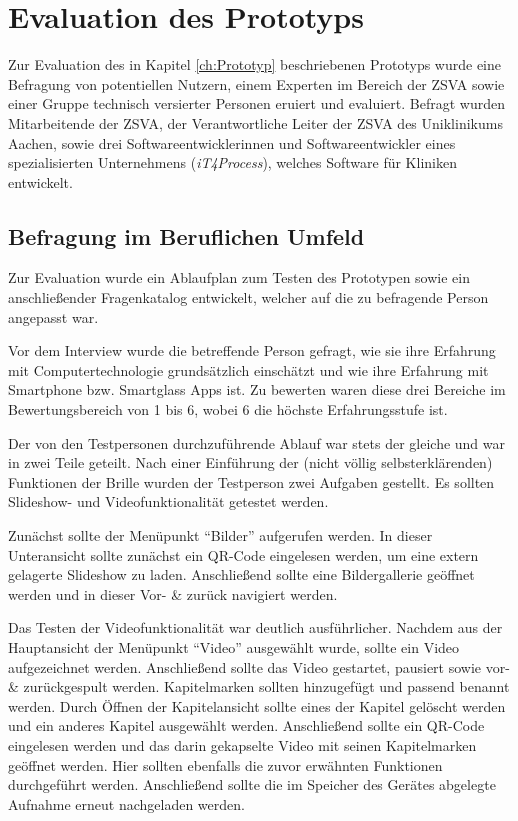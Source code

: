 %
%
%
%
%
%
\chapter{Evaluation des Prototyps}
\label{ch:Evaluation_des_Prototyps}
Zur Evaluation des in Kapitel \ref{ch:Prototyp} beschriebenen Prototyps wurde eine Befragung von potentiellen Nutzern, einem Experten im Bereich der ZSVA sowie einer Gruppe technisch versierter Personen eruiert und evaluiert. Befragt wurden
Mitarbeitende der ZSVA, 
der Verantwortliche Leiter der ZSVA des Uniklinikums Aachen, 
sowie drei Softwareentwicklerinnen und Softwareentwickler eines spezialisierten Unternehmens (\emph{iT4Process}), welches Software für Kliniken entwickelt.
%
%
%
%
%
%
%
%
\section{Befragung im Beruflichen Umfeld}
\label{sec:Befragung_im_Beruflichen_Umfeld}
Zur Evaluation wurde ein Ablaufplan zum Testen des Prototypen sowie ein anschließender Fragenkatalog entwickelt, welcher auf die zu befragende Person angepasst war. 

Vor dem Interview wurde die betreffende Person gefragt, wie sie ihre Erfahrung mit Computertechnologie grundsätzlich einschätzt und wie ihre Erfahrung mit Smartphone bzw. Smartglass Apps ist. Zu bewerten waren diese drei Bereiche im Bewertungsbereich von 1 bis 6, wobei 6 die höchste Erfahrungsstufe ist.

Der von den Testpersonen durchzuführende Ablauf war stets der gleiche und war in zwei Teile geteilt. Nach einer Einführung der (nicht völlig selbsterklärenden) Funktionen der Brille wurden der Testperson zwei Aufgaben gestellt. Es sollten Slideshow- und Videofunktionalität getestet werden. 

Zunächst sollte der Menüpunkt \enquote{Bilder} aufgerufen werden. In dieser Unteransicht sollte zunächst ein QR-Code eingelesen werden, um eine extern gelagerte Slideshow zu laden. Anschließend sollte eine Bildergallerie geöffnet werden und in dieser Vor- \& zurück navigiert werden.

Das Testen der Videofunktionalität war deutlich ausführlicher. Nachdem aus der Hauptansicht der Menüpunkt \enquote{Video} ausgewählt wurde, sollte ein Video aufgezeichnet werden. Anschließend sollte das Video gestartet, pausiert sowie vor- \& zurückgespult werden. Kapitelmarken sollten hinzugefügt und passend benannt werden. Durch Öffnen der Kapitelansicht sollte eines der Kapitel gelöscht werden und ein anderes Kapitel ausgewählt werden. Anschließend sollte ein QR-Code eingelesen werden und das darin gekapselte Video mit seinen Kapitelmarken geöffnet werden. Hier sollten ebenfalls die zuvor erwähnten Funktionen durchgeführt werden. Anschließend sollte die im Speicher des Gerätes abgelegte Aufnahme erneut nachgeladen werden.

